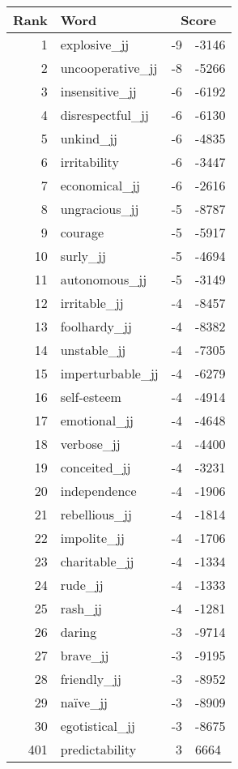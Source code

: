 \begin{longtable}[!htbp]{| rlr@{.}l |}
    \hline
    \textbf{Rank} & \textbf{Word} & \multicolumn{2}{c|}{\textbf{Score}} \\
    \hline
    \endhead
    1 & explosive\_jj & -9 & -3146 \\
    2 & uncooperative\_jj & -8 & -5266 \\
    3 & insensitive\_jj & -6 & -6192 \\
    4 & disrespectful\_jj & -6 & -6130 \\
    5 & unkind\_jj & -6 & -4835 \\
    6 & irritability & -6 & -3447 \\
    7 & economical\_jj & -6 & -2616 \\
    8 & ungracious\_jj & -5 & -8787 \\
    9 & courage & -5 & -5917 \\
    10 & surly\_jj & -5 & -4694 \\
    11 & autonomous\_jj & -5 & -3149 \\
    12 & irritable\_jj & -4 & -8457 \\
    13 & foolhardy\_jj & -4 & -8382 \\
    14 & unstable\_jj & -4 & -7305 \\
    15 & imperturbable\_jj & -4 & -6279 \\
    16 & self-esteem & -4 & -4914 \\
    17 & emotional\_jj & -4 & -4648 \\
    18 & verbose\_jj & -4 & -4400 \\
    19 & conceited\_jj & -4 & -3231 \\
    20 & independence & -4 & -1906 \\
    21 & rebellious\_jj & -4 & -1814 \\
    22 & impolite\_jj & -4 & -1706 \\
    23 & charitable\_jj & -4 & -1334 \\
    24 & rude\_jj & -4 & -1333 \\
    25 & rash\_jj & -4 & -1281 \\
    26 & daring & -3 & -9714 \\
    27 & brave\_jj & -3 & -9195 \\
    28 & friendly\_jj & -3 & -8952 \\
    29 & naïve\_jj & -3 & -8909 \\
    30 & egotistical\_jj & -3 & -8675 \\
    401 & predictability & 3 & 6664 \\

\end{longtable}
